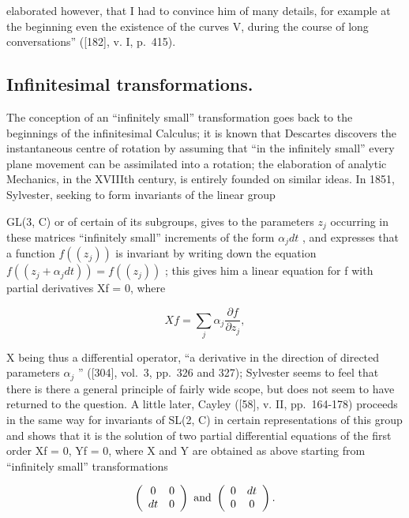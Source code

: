 elaborated however, that I had to convince him of many details, for example at the beginning even the existence of the curves V, during the course of long conversations'' ({[}182{]}, v. I, p.~415).

\subsection{Infinitesimal transformations.}

The conception of an ``infinitely small'' transformation goes back to the beginnings of the infinitesimal Calculus; it is known that Descartes discovers the instantaneous centre of rotation by assuming that ``in the infinitely small'' every plane movement can be assimilated into a rotation; the elaboration of analytic Mechanics, in the XVIIIth century, is entirely founded on similar ideas. In 1851, Sylvester, seeking to form invariants of the linear group

GL(3, C) or of certain of its subgroups, gives to the parameters \(z_{j}\) occurring in these matrices ``infinitely small'' increments of the form \(\alpha_{j}dt\) , and expresses that a function \(f((z_{j}))\) is invariant by writing down the equation \(f((z_{j} + \alpha_{j}dt)) = f((z_{j}))\) ; this gives him a linear equation for f with partial derivatives Xf = 0, where

\[
X f = \sum_ {j} \alpha_ {j} \frac {\partial f}{\partial z _ {j}},\tag{25.1}
\]

X being thus a differential operator, ``a derivative in the direction of directed parameters \(\alpha_{j}\) '' ({[}304{]}, vol.~3, pp.~326 and 327); Sylvester seems to feel that there is there a general principle of fairly wide scope, but does not seem to have returned to the question. A little later, Cayley ({[}58{]}, v. II, pp.~164-178) proceeds in the same way for invariants of SL(2, C) in certain representations of this group and shows that it is the solution of two partial differential equations of the first order Xf = 0, Yf = 0, where X and Y are obtained as above starting from ``infinitely small'' transformations

\[
\left( \begin{array}{c c} 0 & 0 \\ d t & 0 \end{array} \right) \text {   and   } \left( \begin{array}{c c} 0 & d t \\ 0 & 0 \end{array} \right).
\]

